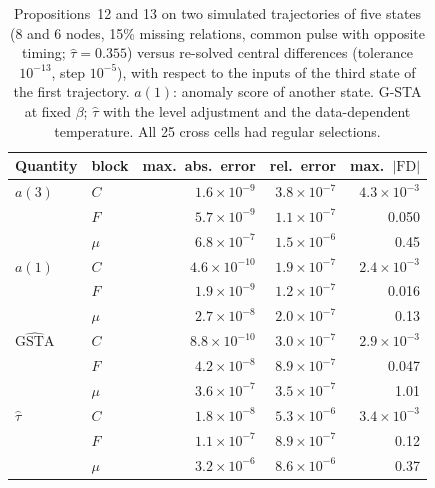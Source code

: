 \begin{table}[h]
\caption{Propositions~12 and 13 on two simulated trajectories of five states (8 and 6 nodes, 15\% missing relations, common pulse with opposite timing; $\hat\tau=0.355$) versus re-solved central differences (tolerance $10^{-13}$, step $10^{-5}$), with respect to the inputs of the third state of the first trajectory. $a(1)$: anomaly score of another state. G-STA at fixed $\beta$; $\hat\tau$ with the level adjustment and the data-dependent temperature. All 25 cross cells had regular selections.}\label{tab:sensverif2}
\centering\footnotesize
\begin{tabular}{llrrr}
\toprule
Quantity & block & max.\ abs.\ error & rel.\ error & max.\ $|\mathrm{FD}|$\\
\midrule
$a(3)$ & $C$ & $1.6\times10^{-9}$ & $3.8\times10^{-7}$ & $4.3\times10^{-3}$\\
 & $F$ & $5.7\times10^{-9}$ & $1.1\times10^{-7}$ & 0.050\\
 & $\mu$ & $6.8\times10^{-7}$ & $1.5\times10^{-6}$ & 0.45\\
$a(1)$ & $C$ & $4.6\times10^{-10}$ & $1.9\times10^{-7}$ & $2.4\times10^{-3}$\\
 & $F$ & $1.9\times10^{-9}$ & $1.2\times10^{-7}$ & 0.016\\
 & $\mu$ & $2.7\times10^{-8}$ & $2.0\times10^{-7}$ & 0.13\\
$\widehat{\mathrm{GSTA}}$ & $C$ & $8.8\times10^{-10}$ & $3.0\times10^{-7}$ & $2.9\times10^{-3}$\\
 & $F$ & $4.2\times10^{-8}$ & $8.9\times10^{-7}$ & 0.047\\
 & $\mu$ & $3.6\times10^{-7}$ & $3.5\times10^{-7}$ & 1.01\\
$\hat\tau$ & $C$ & $1.8\times10^{-8}$ & $5.3\times10^{-6}$ & $3.4\times10^{-3}$\\
 & $F$ & $1.1\times10^{-7}$ & $8.9\times10^{-7}$ & 0.12\\
 & $\mu$ & $3.2\times10^{-6}$ & $8.6\times10^{-6}$ & 0.37\\
\bottomrule
\end{tabular}
\end{table}


